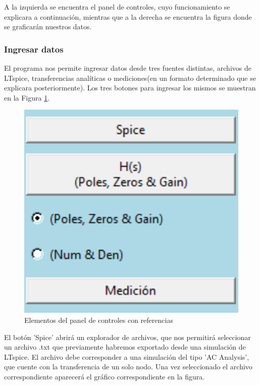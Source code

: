 \documentclass[10pt,a4paper]{article}
\begin{document}
A la izquierda se encuentra el panel de controles, cuyo funcionamiento se explicara a continuación, mientras que a la derecha se encuentra la figura donde se graficarán nuestros datos.


\subsubsection{Ingresar datos}
El programa nos permite ingresar datos desde tres fuentes distintas, archivos de LTspice, transferencias analíticas o mediciones(en un formato determinado que se explicara posteriormente). Los tres botones para ingresar los mismos se muestran en la Figura \ref{fig:inputControls}.

\begin{figure}[ht]
\centering
\includegraphics[scale=0.3]{resources/inputControls.png}
\caption{Elementos del panel de controles con referencias}
\label{fig:inputControls}
\end{figure}

El botón 'Spice' abrirá un explorador de archivos, que nos permitirá seleccionar un archivo .txt que previamente habremos exportado desde una simulación de LTspice. El archivo debe corresponder a una simulación del tipo 'AC Analysis', que cuente con la transferencia de un solo nodo. Una vez seleccionado el archivo correspondiente aparecerá el gráfico correspondiente en la figura.
\end{document}

